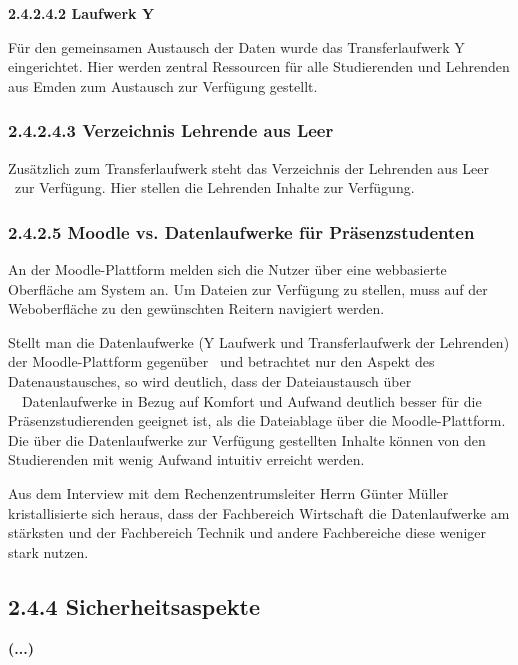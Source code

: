 \documentclass[a4paper]{article}
\newcommand\textstyleAbsatzStandardschriftart[1]{#1}
\begin{document}
\bigskip

{\sffamily\bfseries\color{black}
2.4.2.4.2 Laufwerk Y}

{\sffamily\mdseries\color{black}
\textstyleAbsatzStandardschriftart{Für den gemeinsamen Austausch der Daten wurde das Transferlaufwerk Y eingerichtet.
Hier werden zentral Ressourcen für alle Studierenden und Lehrenden aus Emden zum Austausch zur Verfügung gestellt.}}

\subsubsection{2.4.2.4.3 Verzeichnis Lehrende aus Leer}
{\sffamily\mdseries\color{black}
\textstyleAbsatzStandardschriftart{Zusätzlich zum Transferlaufwerk steht das Verzeichnis der Lehrenden aus Leer \ zur
Verfügung. Hier stellen die Lehrenden Inhalte zur Verfügung.}}

\subsubsection[2.4.2.5 Moodle vs. Datenlaufwerke für Präsenzstudenten]{2.4.2.5 Moodle vs. Datenlaufwerke für
Präsenzstudenten}
{\sffamily\mdseries\color{black}
An der Moodle-Plattform melden sich die Nutzer über eine webbasierte Oberfläche am System an. Um Dateien zur Verfügung
zu stellen, muss auf der Weboberfläche zu den gewünschten Reitern navigiert werden.}


\bigskip

{\sffamily\color{black}
\textstyleAbsatzStandardschriftart{Stellt man die Datenlaufwerke (Y Laufwerk und Transferlaufwerk der Lehrenden) der
Moodle-Plattform gegenüber \ und betrachtet nur den Aspekt des Datenaustausches, so wird deutlich, dass der
Dateiaustausch über \ \ Datenlaufwerke in Bezug auf Komfort und Aufwand deutlich besser für die Präsenzstudierenden
geeignet ist, als die Dateiablage über die Moodle-Plattform. Die über die Datenlaufwerke zur Verfügung gestellten
Inhalte können von den Studierenden mit wenig Aufwand intuitiv erreicht werden.}}


\bigskip

{\sffamily\color{black}
\textstyleAbsatzStandardschriftart{Aus dem Interview mit dem Rechenzentrumsleiter Herrn Günter Müller kristallisierte
sich heraus, dass der Fachbereich Wirtschaft die Datenlaufwerke am stärksten und der Fachbereich Technik und andere
Fachbereiche diese weniger stark nutzen.}}

\subsection[2.4.4 Sicherheitsaspekte]{\bfseries 2.4.4 Sicherheitsaspekte}
{\sffamily\bfseries\color{black}
(...)}
\end{document}
